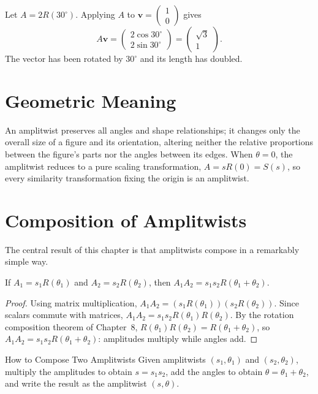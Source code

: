 \begin{example}
Let $A = 2R(30^\circ)$. Applying $A$ to $\mathbf v = \begin{pmatrix} 1\\
0 \end{pmatrix}$ gives
\[
A\mathbf v=
\begin{pmatrix}
2\cos30^\circ\\
2\sin30^\circ
\end{pmatrix}
=
\begin{pmatrix}
\sqrt3\\
1
\end{pmatrix}.
\]
The vector has been rotated by $30^\circ$ and its length has doubled.
\end{example}

\section{Geometric Meaning}

An amplitwist preserves all angles and shape relationships; it changes
only the overall size of a figure and its orientation, altering neither
the relative proportions between the figure's parts nor the angles
between its edges. When $\theta = 0$, the amplitwist reduces to a pure
scaling transformation, $A = sR(0) = S(s)$, so every similarity
transformation fixing the origin is an amplitwist.

\section{Composition of Amplitwists}

The central result of this chapter is that amplitwists compose in a
remarkably simple way.

\begin{theorem}
If $A_1 = s_1R(\theta_1)$ and $A_2 = s_2R(\theta_2)$, then $A_1A_2 =
s_1s_2R(\theta_1+\theta_2)$.
\end{theorem}

\begin{proof}
Using matrix multiplication, $A_1A_2 = (s_1R(\theta_1))(s_2R(\theta_2))$.
Since scalars commute with matrices, $A_1A_2 = s_1s_2
R(\theta_1)R(\theta_2)$. By the rotation composition theorem of
Chapter~8, $R(\theta_1)R(\theta_2) = R(\theta_1+\theta_2)$, so $A_1A_2 =
s_1s_2R(\theta_1+\theta_2)$: amplitudes multiply while angles add.
\end{proof}

\begin{algorithmproc}{How to Compose Two Amplitwists}
Given amplitwists $(s_1,\theta_1)$ and $(s_2,\theta_2)$, multiply the
amplitudes to obtain $s = s_1s_2$, add the angles to obtain $\theta =
\theta_1+\theta_2$, and write the result as the amplitwist $(s,\theta)$.
\end{algorithmproc}

